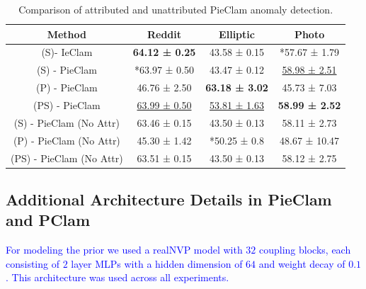 \documentclass{article}
\theoremstyle{plain}
\theoremstyle{definition}
\theoremstyle{remark}
\newcommand{\ron}[1]{{{\textcolor{red}{\textbf{[Ron:} {#1}\textbf{]}}}}}
\newcommand{\dan}[1]{{{\textcolor{blue}{ {#1}\textbf{}}}}}
\begin{document}
\begin{table}[t]
\centering
\begin{tabular}{|c|c|c|c|}
    \hline
  Method  & Reddit & Elliptic & Photo \\
    \hline
  (S)- IeClam& \textbf{64.12 ± 0.25}& 43.58 ± 0.15& *57.67 ± 1.79\\
(S) - PieClam & *63.97 ± 0.50 & 43.47 ± 0.12 & \underline{58.98 ± 2.51} \\
(P) - PieClam & 46.76 ± 2.50 & \textbf{63.18 ± 3.02} & 45.73 ± 7.03 \\
(PS) - PieClam & \underline{63.99 ± 0.50} & \underline{53.81 ± 1.63} & \textbf{58.99 ± 2.52} \\
    \hline
(S) - PieClam (No Attr) & 63.46 ± 0.15 & 43.50 ± 0.13 & 58.11 ± 2.73 \\
  (P) - PieClam (No Attr) & 45.30 ± 1.42 & *50.25 ± 0.8 & 48.67 ± 10.47 \\
  (PS) - PieClam (No Attr) & 63.51 ± 0.15 & 43.50 ± 0.13 & 58.12 ± 2.75 \\
    \hline
\end{tabular}
\caption{Comparison of attributed and unattributed PieClam anomaly detection.}
\label{Table22}
\end{table}



\subsection{Additional Architecture Details in PieClam and PClam}
\dan{For modeling the prior we used a realNVP \cite{dinh2016density} model with $32$ coupling blocks, each consisting of $2$ layer MLPs with a hidden dimension of $64$ and weight decay of $0.1$. This architecture was used across all experiments.}


\end{document}
